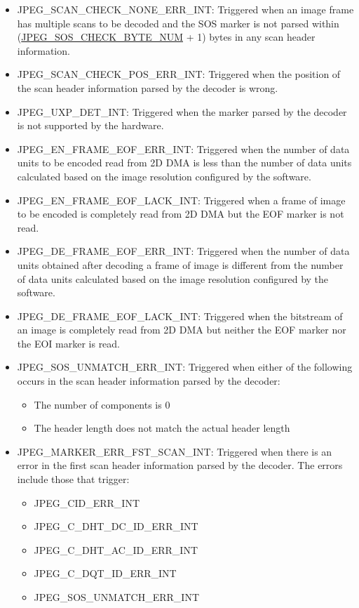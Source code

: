 \documentclass[main\_\_EN.tex]{subfiles}
\begin{document}
\begin{itemize}
\item JPEG\_SCAN\_CHECK\_NONE\_ERR\_INT: Triggered when an image frame has multiple scans to be decoded and the SOS marker is not parsed within (\hyperref[fielddesc:JPEGSOSCHECKBYTENUM]{JPEG\_SOS\_CHECK\_BYTE\_NUM} + 1) bytes in any scan header information.
\item JPEG\_SCAN\_CHECK\_POS\_ERR\_INT: Triggered when the position of the scan header information parsed by the decoder is wrong.
\item JPEG\_UXP\_DET\_INT: Triggered when the marker parsed by the decoder is not supported by the hardware.
\item JPEG\_EN\_FRAME\_EOF\_ERR\_INT: Triggered when the number of data units to be encoded read from 2D DMA is less than the number of data units calculated based on the image resolution configured by the software.
\item JPEG\_EN\_FRAME\_EOF\_LACK\_INT: Triggered when a frame of image to be encoded is completely read from 2D DMA but the EOF marker is not read.
\item JPEG\_DE\_FRAME\_EOF\_ERR\_INT: Triggered when the number of data units obtained after decoding a frame of image is different from the number of data units calculated based on the image resolution configured by the software.
\item JPEG\_DE\_FRAME\_EOF\_LACK\_INT: Triggered when the bitstream of an image is completely read from 2D DMA but neither the EOF marker nor the EOI marker is read.
\item JPEG\_SOS\_UNMATCH\_ERR\_INT: Triggered when either of the following occurs in the scan header information parsed by the decoder:
\begin{itemize}
    \item The number of components is 0
    \item The header length does not match the actual header length
\end{itemize}
\item JPEG\_MARKER\_ERR\_FST\_SCAN\_INT: Triggered when there is an error in the first scan header information parsed by the decoder. The errors include those that trigger:
\begin{itemize}
    \item JPEG\_CID\_ERR\_INT
    \item JPEG\_C\_DHT\_DC\_ID\_ERR\_INT
    \item JPEG\_C\_DHT\_AC\_ID\_ERR\_INT
    \item JPEG\_C\_DQT\_ID\_ERR\_INT
    \item JPEG\_SOS\_UNMATCH\_ERR\_INT

\end{itemize}
\end{itemize}
\end{document}
